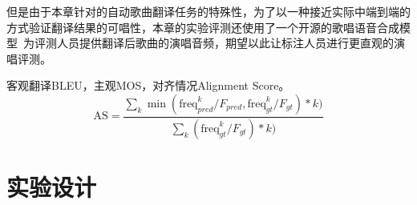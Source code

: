但是由于本章针对的自动歌曲翻译任务的特殊性，为了以一种接近实际中端到端的方式验证翻译结果的可唱性，本章的实验评测还使用了一个开源的歌唱语音合成模型~\citep{diffsinger}为评测人员提供翻译后歌曲的演唱音频，期望以此让标注人员进行更直观的演唱评测。


客观翻译BLEU，主观MOS，对齐情况Alignment Score。
\begin{equation}
    \text{AS} = \frac{\sum_{k}\min(\text{freq}_{pred}^k/F_{pred}, \text{freq}_{gt}^k/F_{gt}) * k)}{\sum_{k} (\text{freq}_{gt}^k/F_{gt}) * k) }
\end{equation}
\section{实验设计}

